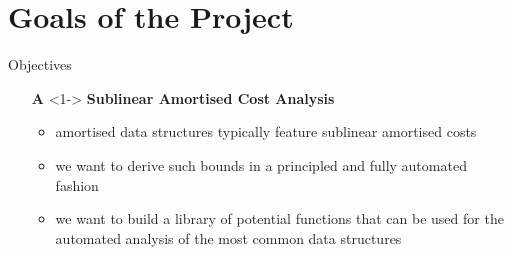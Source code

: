 \documentclass[
11pt,
usepdftitle=false,
aspectratio=169,
xcolor={table,usenames,dvipsnames},
]{beamer}
\newenvironment{mybox}[1]{\begin{block}{#1}}{\end{block}}
\begin{document}
\section{Goals of the Project}
\begin{frame}

  \begin{mybox}{Objectives}
    \begin{enumerate}
    \item[\textbf{A}]<1-> \textbf{Sublinear Amortised Cost Analysis}
      \begin{itemize}
      \item amortised data structures typically feature \alert{sublinear} amortised costs
      \item we want to derive such bounds in a principled and fully automated fashion
      \item we want to build a library of potential functions that can be used for the automated analysis of the most common data structures
      \end{itemize}

      \smallskip
      

\end{enumerate}
\end{mybox}
\end{frame}
\end{document}
